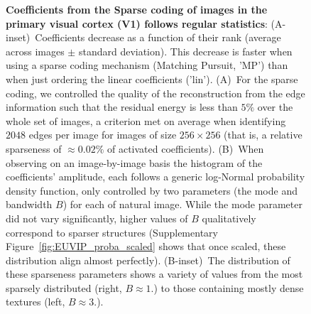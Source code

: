 \documentclass{article}
\begin{document}
\begin{figure}[ht!]%
\caption{
{\bf Coefficients from the Sparse coding of images in the primary visual cortex (V1) follows regular statistics}: \textsf{(A-inset)}~Coefficients decrease as a function of their rank (average across images $\pm$ standard deviation). This decrease is faster when using a sparse coding mechanism (Matching Pursuit, 'MP') than when just ordering the linear coefficients ('lin'). \textsf{(A)}~For the sparse coding, we controlled the quality of the reconstruction from the edge information such that the residual energy is less than $5\%$ over the whole set of images, a criterion met on average when identifying $2048$ edges per image for images of size $256\times 256$ (that is, a relative sparseness of $\approx 0.02\%$ of activated coefficients).
\textsf{(B)}~When observing on an image-by-image basis the histogram of the coefficients' amplitude, each follows a generic log-Normal probability density function, only controlled by two parameters (the mode and bandwidth $B$) for each of natural image. While the mode parameter did not vary significantly, higher values of $B$ qualitatively correspond to sparser structures\if{} (Supplementary Figure~\ref{fig:EUVIP_proba_scaled} shows that once scaled, these distribution align almost perfectly)\fi.
\textsf{(B-inset)}~The distribution of these sparseness parameters shows a variety of values from the most sparsely distributed (right, $B\approx1.$) to those containing mostly dense textures (left, $B\approx3.$).
\label{fig:EUVIP_sparseness}}%
\end{figure}%
\end{document}
